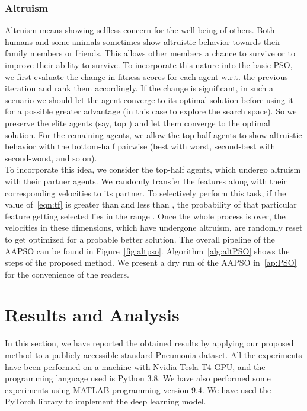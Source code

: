 \documentclass[final,3p,times]{elsarticle}
\begin{document}
\subsubsection{Altruism}
Altruism means showing selfless concern for the well-being of others. Both humans {and} some animals sometimes show altruistic behavior towards their family members or {friends.} This {allows} other members a chance to survive or to improve their ability to survive. To incorporate this nature into the basic PSO, we first evaluate the change in fitness scores for each agent {w.r.t.} the previous iteration and rank them accordingly. If the change is significant, in such a {scenario} we should let the agent converge to its optimal solution before using it for a possible greater advantage (in this case to explore the search space). So we preserve the elite agents (say, top ) and let them converge to the optimal solution. For the remaining agents, we allow the top-half agents to show altruistic behavior with the bottom-half pairwise (best with worst, second-best with second-worst, and so on).\\
To incorporate this idea, we consider the top-half {agents,} which undergo altruism with their partner agents. We randomly transfer the features along with their corresponding velocities to its partner. To selectively perform this task, if the value of~\ref{eqn:tf} is greater than  and less than , the probability of that particular feature getting selected lies in the range . Once the whole process is over, the velocities in these dimensions, which have {undergone altruism,} are randomly reset to get optimized for a probable better solution. The overall pipeline of the AAPSO can be found in Figure~\ref{fig:altpso}. Algorithm~\ref{alg:altPSO} shows the steps of the proposed method. {We present a} dry run of the AAPSO in~\ref{ap:PSO} for the convenience of the readers. 
\section{Results and Analysis}
\label{sec:results}
In this section, we have reported the obtained results by applying our proposed method to a publicly accessible standard Pneumonia dataset. All the experiments have been performed on a machine with Nvidia Tesla T4 GPU, and the programming language used is Python 3.8. We have also performed some experiments using MATLAB programming version 9.4. We have used the PyTorch library to implement the deep learning model.
\end{document}
